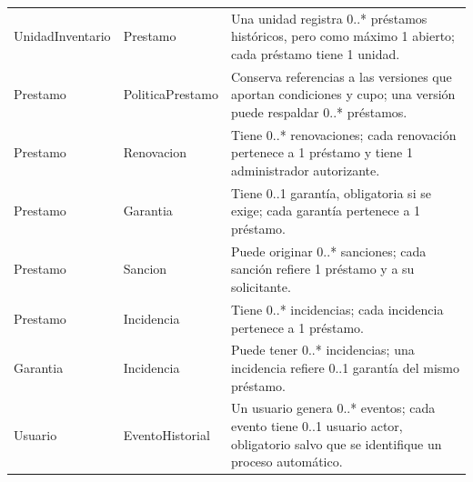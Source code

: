 \begin{longtable}{@{}>{\raggedright\arraybackslash}p{3.1cm}>{\raggedright\arraybackslash}p{3.2cm}>{\raggedright\arraybackslash}p{8cm}@{}}
UnidadInventario & Prestamo & Una unidad registra 0..* pr\'estamos hist\'oricos, pero como m\'aximo 1 abierto; cada pr\'estamo tiene 1 unidad. \\
Prestamo & PoliticaPrestamo & Conserva referencias a las versiones que aportan condiciones y cupo; una versi\'on puede respaldar 0..* pr\'estamos. \\
Prestamo & Renovacion & Tiene 0..* renovaciones; cada renovaci\'on pertenece a 1 pr\'estamo y tiene 1 administrador autorizante. \\
Prestamo & Garantia & Tiene 0..1 garant\'ia, obligatoria si se exige; cada garant\'ia pertenece a 1 pr\'estamo. \\
Prestamo & Sancion & Puede originar 0..* sanciones; cada sanci\'on refiere 1 pr\'estamo y a su solicitante. \\
Prestamo & Incidencia & Tiene 0..* incidencias; cada incidencia pertenece a 1 pr\'estamo. \\
Garantia & Incidencia & Puede tener 0..* incidencias; una incidencia refiere 0..1 garant\'ia del mismo pr\'estamo. \\
Usuario & EventoHistorial & Un usuario genera 0..* eventos; cada evento tiene 0..1 usuario actor, obligatorio salvo que se identifique un proceso autom\'atico. \\
\end{longtable}
\endgroup
